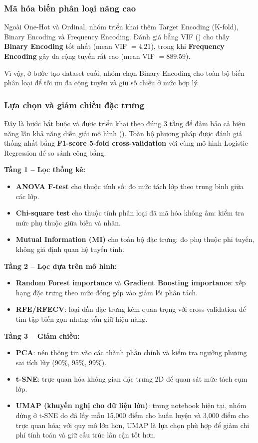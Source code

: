 \subsubsection{Mã hóa biến phân loại nâng cao}
Ngoài One-Hot và Ordinal, nhóm triển khai thêm Target Encoding (K-fold), Binary Encoding và Frequency Encoding. Đánh giá bằng VIF (\cite{james2013islr}) cho thấy \textbf{Binary Encoding} tốt nhất (mean VIF $=4.21$), trong khi \textbf{Frequency Encoding} gây đa cộng tuyến rất cao (mean VIF $=889.59$).

Vì vậy, ở bước tạo dataset cuối, nhóm chọn Binary Encoding cho toàn bộ biến phân loại để tối ưu đa cộng tuyến và giữ số chiều ở mức hợp lý.

\subsubsection{Lựa chọn và giảm chiều đặc trưng}
Đây là bước bắt buộc và được triển khai theo đúng 3 tầng để đảm bảo cả hiệu năng lẫn khả năng diễn giải mô hình (\cite{guyon2002gene,jolliffe2002pca,breiman2001random}). Toàn bộ phương pháp được đánh giá thống nhất bằng \textbf{F1-score 5-fold cross-validation} với cùng mô hình Logistic Regression để so sánh công bằng.

\textbf{Tầng 1 -- Lọc thống kê:}
\begin{itemize}
    \item \textbf{ANOVA F-test} cho thuộc tính số: đo mức tách lớp theo trung bình giữa các lớp.
    \item \textbf{Chi-square test} cho thuộc tính phân loại đã mã hóa không âm: kiểm tra mức phụ thuộc giữa biến và nhãn.
    \item \textbf{Mutual Information (MI)} cho toàn bộ đặc trưng: đo phụ thuộc phi tuyến, không giả định quan hệ tuyến tính.
\end{itemize}

\textbf{Tầng 2 -- Lọc dựa trên mô hình:}
\begin{itemize}
    \item \textbf{Random Forest importance} và \textbf{Gradient Boosting importance}: xếp hạng đặc trưng theo mức đóng góp vào giảm lỗi phân tách.
    \item \textbf{RFE/RFECV}: loại dần đặc trưng kém quan trọng với cross-validation để tìm tập biến gọn nhưng vẫn giữ hiệu năng.
\end{itemize}

\textbf{Tầng 3 -- Giảm chiều:}
\begin{itemize}
    \item \textbf{PCA}: nén thông tin vào các thành phần chính và kiểm tra ngưỡng phương sai tích lũy (90\%, 95\%, 99\%).
    \item \textbf{t-SNE}: trực quan hóa không gian đặc trưng 2D để quan sát mức tách cụm lớp.
    \item \textbf{UMAP (khuyến nghị cho dữ liệu lớn)}: trong notebook hiện tại, nhóm dừng ở t-SNE do đã lấy mẫu 15{,}000 điểm cho huấn luyện và 3{,}000 điểm cho trực quan hóa; với quy mô lớn hơn, UMAP là lựa chọn phù hợp để giảm chi phí tính toán và giữ cấu trúc lân cận tốt hơn.
\end{itemize}

